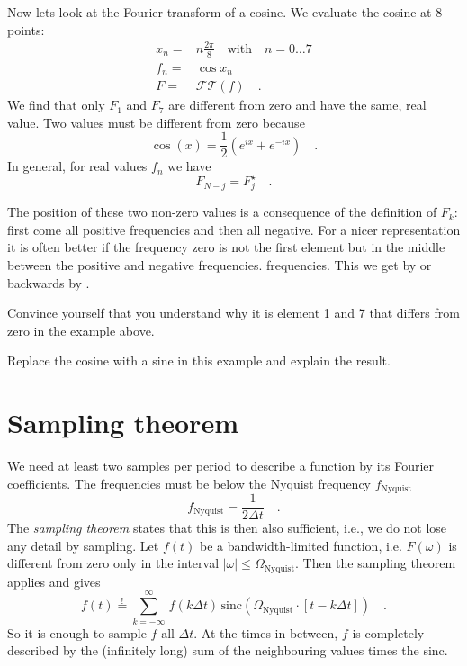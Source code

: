 Now lets look at the Fourier transform of a cosine. We evaluate the cosine at 8 points:
\begin{align}
  x_n = & n \frac{2 \pi}{8} \quad \text{with} \quad n = 0 \dots 7 \\
  f_n = & \cos x_n \\
  F = & \mathcal{FT} (f) \quad .
\end{align}
We find that only $F_1$ and $F_7$ are different from zero and have the same, real value.
Two values must be different from zero because
\begin{equation}
 \cos(x) = \frac{1}{2} \left(e^{i x} + e^{-i x} \right) \quad .
\end{equation}
In general, for real  values $f_n$ we have
\begin{equation}
F_{N-j} = F_j^\star \quad .
\end{equation}



The position of these two non-zero values is a
consequence of the definition of $F_k$: first come all positive
frequencies and then all negative. For a nicer representation it is often better if the frequency zero is not the first element
but in the middle between the positive and negative frequencies.
frequencies. This we get by   or backwards by .  

\begin{questions}
  \item Convince yourself that you understand why it is element 1 and 7 that differs from zero in the example above.
  \item Replace the cosine with a sine in this example and
  explain the result.
\end{questions}
  



\section{Sampling theorem}

We need at least two samples per period to describe a function by its
   Fourier coefficients. The frequencies must be
   below the Nyquist frequency $f_\text{Nyquist}$
%
\begin{equation}
f_\text{Nyquist} = \frac{1}{2 \Delta t} \quad .
\end{equation}
%
The \emph{sampling theorem} states that this is then also sufficient, i.e., we do not lose any detail by sampling.
Let $f(t)$ be a bandwidth-limited function, i.e.
$F(\omega)$ is different from zero only in the interval $|\omega| \le \Omega_\text{Nyquist}$. Then the sampling theorem applies and gives 
%
\begin{equation}
f(t) \overset{!}{=} \sum_{k=-\infty}^{\infty} \, f( k \Delta t) \, \text{sinc} \left( \Omega_\text{Nyquist} \cdot [t - k \Delta t] \right) \quad .
\end{equation}
So it is enough to sample $f$ all $\Delta t$. At the
times in between, $f$ is completely described by the (infinitely long) sum of the
neighbouring values times the sinc.

